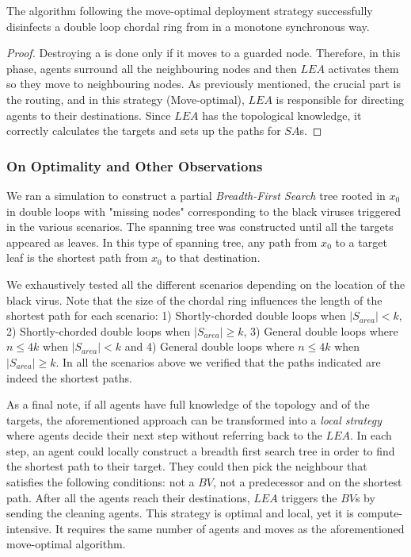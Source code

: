 \begin{theorem}\label{correctnes_mo}
The  algorithm  following  the move-optimal deployment strategy successfully disinfects a double loop chordal ring from \bvs in a monotone synchronous way.
\end{theorem}
\begin{proof}
Destroying a \bv is done only if it moves to a guarded node. Therefore, in this phase, agents surround all the neighbouring nodes  and then $LEA$ activates them so they move to neighbouring nodes. As previously mentioned, the crucial part is the routing, and in this strategy (Move-optimal), $LEA$ is responsible for directing agents to their destinations. Since $LEA$ has the topological knowledge, it correctly calculates the targets and sets up the paths for $SA$s.
\end{proof}
\subsubsection{On Optimality and Other Observations}\label{local-opt}
 

 We ran a simulation to construct a partial  {\it Breadth-First Search} tree rooted in $x_0$ 
in double loops  with "missing nodes" corresponding to the black viruses triggered in the various scenarios. The spanning tree was constructed until all the targets appeared as leaves. In this type of spanning tree, any path from $x_0$ to a target leaf is the shortest path from $x_0$  to that destination.

We exhaustively tested all the different scenarios depending on the location of the black virus. Note that the size of the chordal ring influences the length of the shortest path for each scenario: 
 1) Shortly-chorded double loops when $|S_{area}|<k$, 2) Shortly-chorded double loops when $|S_{area}|\ge k$, 3) General double loops where $n\leq4k$ when $|S_{area}|<k$ and 4) General double loops where $n\leq4k$ when $|S_{area}|\ge k$.
In all the scenarios above we verified that the paths indicated are indeed the shortest paths.

\medbreak

As a final note,  if all agents have full knowledge of the topology and of the targets,   the aforementioned approach can be transformed into a {\em local strategy} where agents decide their next step without referring back to the $LEA$. In each step, an agent could locally construct a breadth first search tree in order to find the shortest path to their target. They could then pick the neighbour that satisfies the following conditions:  not a $BV$,  not a predecessor and on the shortest path.
After all the agents reach their destinations, $LEA$ triggers the $BV$s by sending the cleaning agents. This strategy is optimal and local, yet it is compute-intensive. It requires the same number of agents and moves as the aforementioned move-optimal algorithm.



